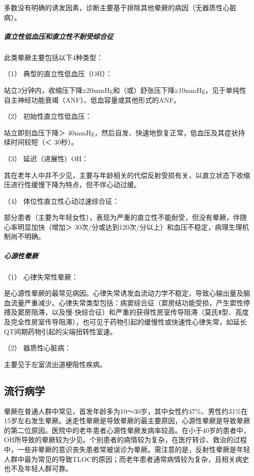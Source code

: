 多数没有明确的诱发因素，诊断主要基于排除其他晕厥的病因（无器质性心脏病）。

\subparagraph{直立性低血压和直立性不耐受综合征}

此类晕厥主要包括以下4种类型：

\hypertarget{text00014.htmlux5cux23CHP1-4-1-2-1}{}
（1） 典型的直立性低血压（OH）：

站立3分钟内，收缩压下降≥20mmHg和（或）舒张压下降≥10mmHg，见于单纯性自主神经功能衰竭（ANF）、低血容量或其他形式的ANF。

\hypertarget{text00014.htmlux5cux23CHP1-4-1-2-2}{}
（2） 初始性直立性低血压：

站立即刻血压下降＞
40mmHg，然后自发、快速地恢复正常，低血压及其症状持续时间较短（＜
30秒）。

\hypertarget{text00014.htmlux5cux23CHP1-4-1-2-3}{}
（3） 延迟（进展性）OH：

其在老年人中并不少见，主要与年龄相关的代偿反射受损有关，以直立状态下收缩压进行性缓慢下降为特点，但不伴心动过缓。

\hypertarget{text00014.htmlux5cux23CHP1-4-1-2-4}{}
（4） 体位性直立性心动过速综合征：

部分患者（主要为年轻女性），表现为严重的直立性不能耐受，但没有晕厥，伴随心率明显加快（增加＞
30次/分或达到120次/分以上）和血压不稳定，病理生理机制尚不明确。

\subparagraph{心源性晕厥}

\hypertarget{text00014.htmlux5cux23CHP1-4-1-3-1}{}
（1） 心律失常性晕厥：

是心源性晕厥的最常见病因。心律失常诱发血流动力学不稳定，导致心输出量及脑血流量严重减少。心律失常类型包括：病窦综合征（窦房结功能受损，产生窦性停搏及窦房阻滞，以及慢-快综合征）和严重的获得性房室传导阻滞（莫氏Ⅱ型、高度及完全性房室传导阻滞），也可见于药物引起的缓慢性或快速性心律失常，如延长QT间期药物引起的尖端扭转性室速。

\hypertarget{text00014.htmlux5cux23CHP1-4-1-3-2}{}
（2） 器质性心脏病：

主要见于左室流出道梗阻性疾病。

\subsection{流行病学}

晕厥在普通人群中常见，首发年龄多为10～30岁，其中女性约47\%、男性约31\%在15岁左右发生晕厥。迷走性晕厥是导致晕厥的最主要原因，心源性晕厥是导致晕厥的第二位原因。医院中的老年患者心源性晕厥发病率较高。在小于40岁的患者中，OH所导致的晕厥较为少见。个别患者的病情较为复杂，在医疗转诊、救治的过程中，一些非晕厥的意识丧失患者常被误诊为晕厥。需注意的是，反射性晕厥是年轻人群中最为常见的导致TLOC的原因；而老年患者通常病情较为复杂，且相关病史也不及年轻人群可靠。

